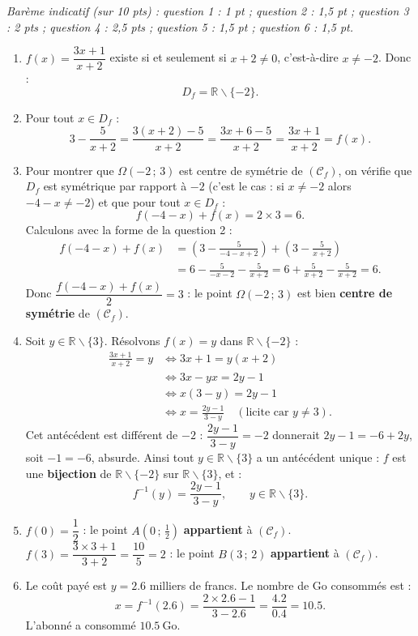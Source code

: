 \documentclass[11pt]{article}
\def\setminus{\mathbin{\backslash}}\let\smallsetminus\setminus
\begin{document}
\begin{corrige}
\emph{Barème indicatif (sur 10 pts) : question 1 : 1 pt ; question 2 : 1,5 pt ; question 3 : 2 pts ; question 4 : 2,5 pts ; question 5 : 1,5 pt ; question 6 : 1,5 pt.}

\begin{enumerate}
\item $f(x)=\dfrac{3x+1}{x+2}$ existe si et seulement si $x+2\neq 0$, c'est-à-dire $x\neq -2$. Donc :
\[ D_f=\mathbb{R}\setminus\{-2\}. \]
\item Pour tout $x\in D_f$ :
\[ 3-\frac{5}{x+2}=\frac{3(x+2)-5}{x+2}=\frac{3x+6-5}{x+2}=\frac{3x+1}{x+2}=f(x). \]
\item Pour montrer que $\Omega(-2\,;\,3)$ est centre de symétrie de $(\mathcal{C}_f)$, on vérifie que $D_f$ est symétrique par rapport à $-2$ (c'est le cas : si $x\neq -2$ alors $-4-x\neq -2$) et que pour tout $x\in D_f$ :
\[ f(-4-x)+f(x)=2\times 3=6. \]
Calculons avec la forme de la question 2 :
\begin{align*}
f(-4-x)+f(x)&=\left(3-\frac{5}{-4-x+2}\right)+\left(3-\frac{5}{x+2}\right)\\
&=6-\frac{5}{-x-2}-\frac{5}{x+2}=6+\frac{5}{x+2}-\frac{5}{x+2}=6.
\end{align*}
Donc $\dfrac{f(-4-x)+f(x)}{2}=3$ : le point $\Omega(-2\,;\,3)$ est bien \textbf{centre de symétrie} de $(\mathcal{C}_f)$.
\item Soit $y\in\mathbb{R}\setminus\{3\}$. Résolvons $f(x)=y$ dans $\mathbb{R}\setminus\{-2\}$ :
\begin{align*}
\frac{3x+1}{x+2}=y &\iff 3x+1=y(x+2)\\
&\iff 3x-yx=2y-1\\
&\iff x(3-y)=2y-1\\
&\iff x=\frac{2y-1}{3-y} \quad (\text{licite car } y\neq 3).
\end{align*}
Cet antécédent est différent de $-2$ : $\dfrac{2y-1}{3-y}=-2$ donnerait $2y-1=-6+2y$, soit $-1=-6$, absurde. Ainsi tout $y\in\mathbb{R}\setminus\{3\}$ a un antécédent unique : $f$ est une \textbf{bijection} de $\mathbb{R}\setminus\{-2\}$ sur $\mathbb{R}\setminus\{3\}$, et :
\[ f^{-1}(y)=\frac{2y-1}{3-y},\qquad y\in\mathbb{R}\setminus\{3\}. \]
\item $f(0)=\dfrac{1}{2}$ : le point $A(0\,;\,\tfrac{1}{2})$ \textbf{appartient} à $(\mathcal{C}_f)$. $f(3)=\dfrac{3\times 3+1}{3+2}=\dfrac{10}{5}=2$ : le point $B(3\,;\,2)$ \textbf{appartient} à $(\mathcal{C}_f)$.
\item Le coût payé est $y=\num{2,6}$ milliers de francs. Le nombre de Go consommés est :
\[ x=f^{-1}(\num{2,6})=\frac{2\times\num{2,6}-1}{3-\num{2,6}}=\frac{\num{4,2}}{\num{0,4}}=\num{10,5}. \]
L'abonné a consommé $\boxed{\num{10,5}\ \text{Go}}$.
\end{enumerate}
\end{corrige}
\end{document}
